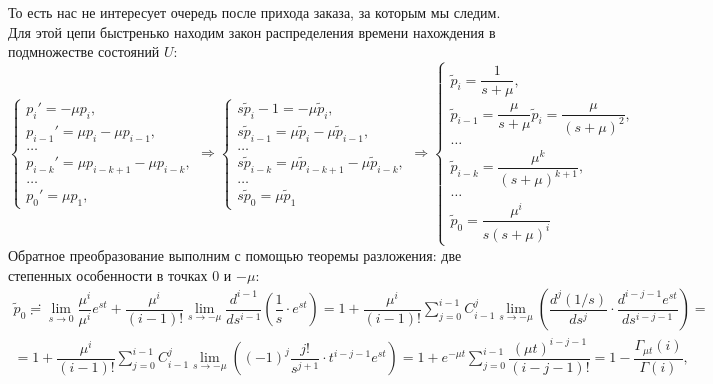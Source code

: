 То есть нас не интересует очередь после прихода заказа, за которым мы следим.
Для этой цепи быстренько находим закон распределения времени нахождения в
подмножестве состояний $U$:
\[
  \begin{cases}
    p_i'=-\mu p_i,\\
    p_{i-1}'=\mu p_i - \mu p_{i-1},\\
    \dots\\
    p_{i-k}' = \mu p_{i-k+1} - \mu p_{i-k},\\
    \dots\\
    p_0' = \mu p_1,
  \end{cases}
  \Rightarrow
  \begin{cases}
    s \tilde{p}_i-1 = -\mu \tilde{p}_i, \\
    s \tilde{p}_{i-1} = \mu \tilde{p}_i - \mu \tilde{p}_{i-1},\\
    \dots\\
    s \tilde{p}_{i-k} = \mu \tilde{p}_{i-k+1} - \mu \tilde{p}_{i-k},\\
    \dots\\
    s\tilde{p}_0 = \mu \tilde{p}_1
  \end{cases}
  \Rightarrow
  \begin{cases}
    \tilde{p}_i = \dfrac{1}{s+\mu},\\
    \tilde{p}_{i-1} = \dfrac{\mu}{s+\mu} \tilde{p}_i = \dfrac{\mu}{(s+\mu)^2}, \\
    \dots\\
    \tilde{p}_{i-k} = \dfrac{\mu^k}{(s+\mu)^{k+1}}, \\
    \dots\\
    \tilde{p}_0 = \dfrac{\mu^i}{s (s+\mu)^i} 
  \end{cases}
\]
Обратное преобразование выполним с помощью теоремы разложения:
две степенных особенности в точках $0$ и $-\mu$:
\begin{multline*}
  \tilde{p}_0 \risingdotseq \lim_{s\to 0} \dfrac{\mu^i}{\mu^i} e^{st} 
  + \dfrac{\mu^i}{(i-1)!} \lim_{s\to -\mu} \dfrac{d^{i-1}}{ds^{i-1}} \left( \dfrac{1}{s} \cdot e^{st} \right)
  = 1
  + \dfrac{\mu^i}{(i-1)!} \sum_{j=0}^{i-1} C_{i-1}^j \lim_{s\to -\mu}
  \left( \dfrac{d^j (1/s)}{ds^j} \cdot \dfrac{d^{i-j-1} e^{st}}{ds^{i-j-1}} \right) = \\
  = 1 + \dfrac{\mu^i}{(i-1)!} \sum_{j=0}^{i-1} C_{i-1}^j \lim_{s\to -\mu} \left(
  (-1)^j \dfrac{j!}{s^{j+1}} \cdot t^{i-j-1} e^{st} \right)
  = 1 + e^{-\mu t} \sum_{j=0}^{i-1} \dfrac{(\mu t)^{i-j-1}}{(i-j-1)!}
  = 1 - \dfrac{\Gamma_{\mu t}(i)}{\Gamma(i)},
\end{multline*}
